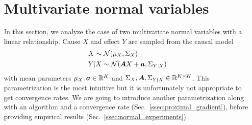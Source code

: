 \section{{Multivariate normal variables}}
In this section, we analyze the case of two multivariate normal variables with a linear relationship.
Cause $X$ and effect $Y$ are sampled from the causal model
\begin{align}
    \label{eq:normal_mean_model}
    & X \sim \cN(\mu_X, \Sigma_X)
   \\ %
    & Y|X \sim \cN(\mA X + \va, \Sigma_{Y|X})
\end{align}
with mean parameters $\mu_X, {\bm{a}} \in \mathbb{R}^K$ and $\Sigma_X, {\bm{A}}, \Sigma_{Y|X} \in \mathbb{R}^{K\times K}$.
This parametrization is the most intuitive but it is unfortunately not appropriate to get convergence rates.
We are going to introduce another parametrization  
along with an algorithm and a convergence rate (Sec.~\ref{ssec:proximal_gradient}),
before providing empirical results (Sec.~\ref{ssec:normal_experiments}).


